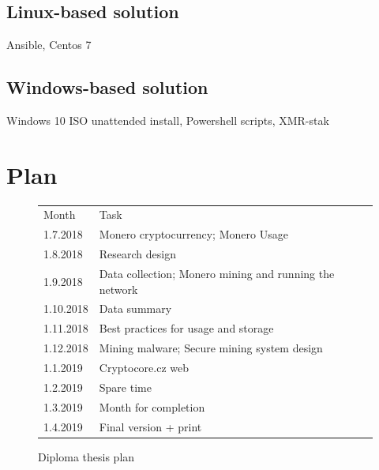 \documentclass[
  printed, %
  table,   %
  nolof,     %
  nolot,     %
           oneside, color
]{fithesis3}
\begin{document}
\section{Linux-based solution}
Ansible, Centos 7
\section{Windows-based solution}
Windows 10 ISO unattended install, Powershell scripts, XMR-stak

\chapter{Plan}

\begin{figure}[H]
\center
\begin{tabular}{ll}
Month     & Task                                              \\
1.7.2018  & Monero cryptocurrency; Monero Usage              \\
1.8.2018  & Research design  \\
1.9.2018  & Data collection; Monero mining and running the network \\
1.10.2018 & Data summary                                   \\
1.11.2018 & Best practices for usage and storage                \\
1.12.2018 & Mining malware; Secure mining system design     \\
1.1.2019  & Cryptocore.cz web            \\
1.2.2019  & Spare time                                           \\
1.3.2019  & Month for completion                                 \\
1.4.2019  & Final version + print                            
\end{tabular}
\caption{Diploma thesis plan}
\label{ssme-thesis-plan}
\end{figure}



\printbibliography[heading=bibintoc]
\end{document}
